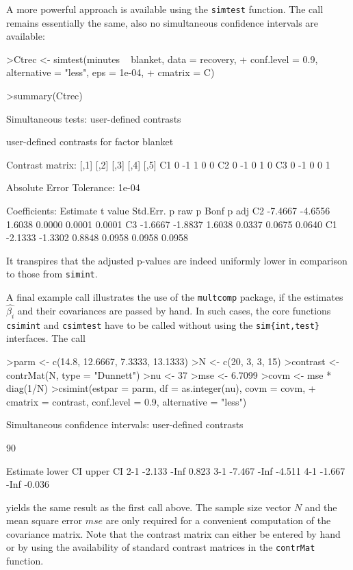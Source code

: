 \documentclass{article}
\begin{document}
A more powerful approach is available using the \texttt{simtest}
function. The call remains essentially the same, also no simultaneous confidence intervals are available:
\small
\begin{Schunk}
\begin{Sinput}
>Ctrec <- simtest(minutes ~ blanket, data = recovery, 
+     conf.level = 0.9, alternative = "less", eps = 1e-04, 
+     cmatrix = C)
\end{Sinput}
\end{Schunk}
\begin{Schunk}
\begin{Sinput}
>summary(Ctrec)
\end{Sinput}
\begin{Soutput}
	 Simultaneous tests: user-defined contrasts 

	 user-defined contrasts for factor blanket

Contrast matrix:
   [,1] [,2] [,3] [,4] [,5]
C1    0   -1    1    0    0
C2    0   -1    0    1    0
C3    0   -1    0    0    1


Absolute Error Tolerance:  1e-04 

Coefficients:
   Estimate t value Std.Err.  p raw p Bonf  p adj
C2  -7.4667 -4.6556   1.6038 0.0000 0.0001 0.0001
C3  -1.6667 -1.8837   1.6038 0.0337 0.0675 0.0640
C1  -2.1333 -1.3302   0.8848 0.0958 0.0958 0.0958
\end{Soutput}
\end{Schunk}
\normalsize
It transpires that the adjusted p-values are indeed
uniformly lower in comparison to those from \texttt{simint}.

A final example call illustrates the use of the \texttt{multcomp} package, if the
estimates $\hat{\beta_i}$ and their covariances are passed by
hand. In such cases, the core functions \texttt{csimint} and
\texttt{csimtest} have to be called without using the
\texttt{sim\{int,test\}} interfaces. The call 
\small
\begin{Schunk}
\begin{Sinput}
>parm <- c(14.8, 12.6667, 7.3333, 13.1333)
>N <- c(20, 3, 3, 15)
>contrast <- contrMat(N, type = "Dunnett")
>nu <- 37
>mse <- 6.7099
>covm <- mse * diag(1/N)
>csimint(estpar = parm, df = as.integer(nu), covm = covm, 
+     cmatrix = contrast, conf.level = 0.9, alternative = "less")
\end{Sinput}
\begin{Soutput}
	Simultaneous confidence intervals: user-defined
	contrasts

	90 % confidence intervals

    Estimate lower CI upper CI
2-1   -2.133     -Inf    0.823
3-1   -7.467     -Inf   -4.511
4-1   -1.667     -Inf   -0.036
\end{Soutput}
\end{Schunk}
\normalsize 
yields the same result as the first call above. The
sample size vector $N$ and the mean square error $mse$ are only
required for a convenient computation of the covariance matrix.
Note that the contrast matrix can either be entered by hand or by
using the availability of standard contrast matrices in the
\texttt{contrMat} function.
\end{document}
